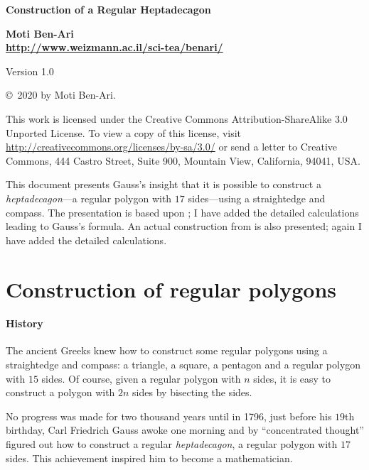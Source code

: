 \documentclass[11pt,a4paper]{article}
\begin{document}

\thispagestyle{empty}
\begin{center}
\textbf{\LARGE Construction of a Regular Heptadecagon}

\bigskip

\textbf{\Large Moti Ben-Ari\\\bigskip\url{http://www.weizmann.ac.il/sci-tea/benari/}}

\smallskip

Version 1.0

\medskip
\end{center}


\begin{footnotesize}
\begin{center}
\copyright{}\  2020 by Moti Ben-Ari. 
\end{center}
This work is licensed under the Creative Commons Attribution-ShareAlike 3.0 Unported License. To view a copy of this license, visit \url{http://creativecommons.org/licenses/by-sa/3.0/} or send a letter to Creative Commons, 444 Castro Street, Suite 900, Mountain View, California, 94041, USA.

\end{footnotesize}

This document presents Gauss's insight that it is possible to construct a \emph{heptadecagon}---a regular polygon with $17$ sides---using a straightedge and compass. The presentation is based upon \cite{jorg}; I have added the detailed calculations leading to Gauss's formula. An actual construction from \cite{callagy} is also presented; again I have added the detailed calculations.

\section{Construction of regular polygons}

\paragraph{History}
The ancient Greeks knew how to construct some regular polygons using a straightedge and compass: a triangle, a square, a pentagon and a regular polygon with $15$ sides. Of course, given a regular polygon with $n$ sides, it is easy to construct a polygon with $2n$ sides by bisecting the sides.

No progress was made for two thousand years until in 1796, just before his $19$th birthday, Carl Friedrich Gauss awoke one morning and by ``concentrated thought'' figured out how to construct a regular \emph{heptadecagon}, a regular polygon with $17$ sides. This achievement inspired him to become a mathematician.
\end{document}
